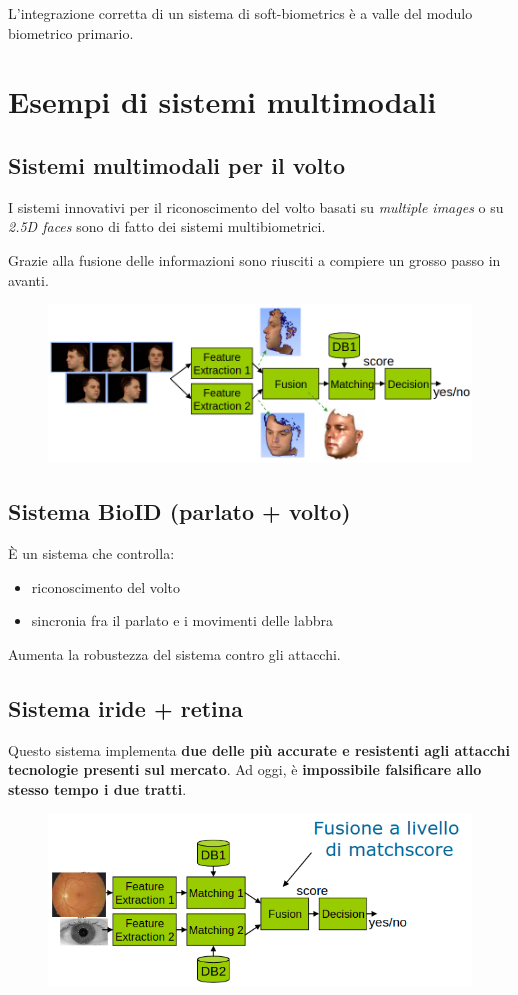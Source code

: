 \documentclass{report}
\begin{document}
\noindent L'integrazione corretta di un sistema di soft-biometrics è a valle 
del modulo biometrico primario.


\chapter{Esempi di sistemi multimodali}

\section{Sistemi multimodali per il volto}
I sistemi innovativi per il riconoscimento del volto basati su \textit{multiple images}
o su \textit{2.5D faces} sono di fatto dei sistemi multibiometrici.

\noindent Grazie alla fusione delle informazioni sono riusciti a compiere un grosso 
passo in avanti.

\begin{figure}[H]
    \centering
    \includegraphics[width=1\linewidth]{images/volto.png}
\end{figure}

\section{Sistema BioID (parlato + volto)}
È un sistema che controlla:
\begin{itemize}
    \item riconoscimento del volto 
    \item sincronia fra il parlato e i movimenti delle labbra
\end{itemize}

\noindent Aumenta la robustezza del sistema contro gli attacchi.

\section{Sistema iride + retina}
Questo sistema implementa \textbf{due delle più accurate e resistenti 
agli attacchi tecnologie presenti sul mercato}. Ad oggi, è \textbf{impossibile
falsificare allo stesso tempo i due tratti}.

\begin{figure}[H]
    \centering
    \includegraphics[width=1\linewidth]{images/iride-retina.png}
\end{figure}
\end{document}
